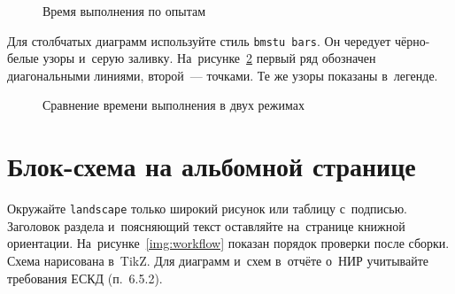\documentclass{bmstu}
\begin{document}
\begin{figure}[htbp]
    \centering
    \caption{Время выполнения по опытам}
    \label{img:measurements}
\end{figure}

Для столбчатых диаграмм используйте стиль \texttt{bmstu bars}.
Он чередует чёрно-белые узоры и~серую заливку.
На~рисунке~\ref{img:measurement-bars} первый ряд обозначен диагональными линиями, второй~--- точками.
Те же узоры показаны в~легенде.

\begin{figure}[htbp]
    \centering
    \caption{Сравнение времени выполнения в двух режимах}
    \label{img:measurement-bars}
\end{figure}

\section{Блок-схема на альбомной странице}

Окружайте \texttt{landscape} только широкий рисунок или таблицу с~подписью.
Заголовок раздела и~поясняющий текст оставляйте на~странице книжной ориентации.
На~рисунке~\ref{img:workflow} показан порядок проверки после сборки.
Схема нарисована в~TikZ.
Для диаграмм и~схем в~отчёте о~НИР учитывайте требования ЕСКД (п.~6.5.2).
\end{document}
